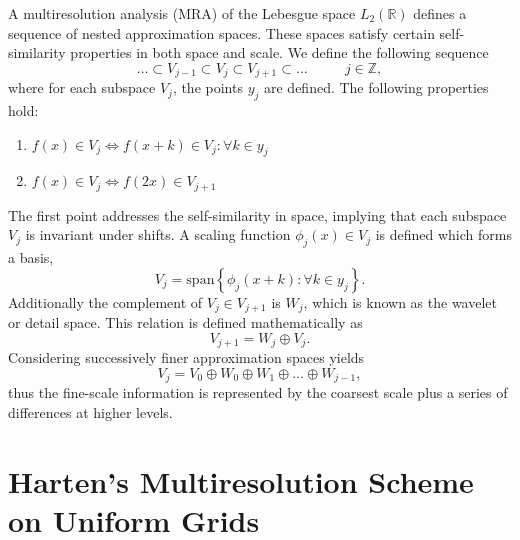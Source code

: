 \documentclass{article}
\begin{document}
    A multiresolution analysis (MRA) of the Lebesgue space
    $L_{2}(\mathbb{R})$ defines a sequence of nested approximation spaces.
    These spaces satisfy certain self-similarity properties in both space
    and scale. We define the following sequence
    \begin{equation*}
        \dots \subset V_{j-1} \subset V_{j} \subset V_{j+1} \subset \dots \text{ }
        \text{ } \text{ } \text{ } j\in \mathbb{Z},
    \end{equation*}
    where for each subspace $V_{j}$, the points $y_{j}$ are defined. The
    following properties hold:
    \begin{enumerate}
        \item $f(x) \in V_{j} \Leftrightarrow f(x+k) \in V_{j} : \forall k
            \in y_{j}$
        \item $f(x) \in V_{j} \Leftrightarrow f(2x) \in V_{j+1}$ 
    \end{enumerate}
    The first point addresses the self-similarity in space, implying that
    each subspace $V_{j}$ is invariant under shifts. A scaling function
    $\phi_{j}(x) \in V_{j}$ is defined which forms a basis,
    \begin{equation*}
        V_{j} = \text{span} \left\{ \phi_{j}(x+k) : \forall k \in y_{j}
        \right\}.
    \end{equation*}
    Additionally the complement of $V_{j} \in V_{j+1}$ is $W_{j}$, which is
    known as the wavelet or detail space. This relation is defined
    mathematically as
    \begin{equation*}
        V_{j+1} = W_{j} \oplus V_{j}.
    \end{equation*}
    Considering successively finer approximation spaces yields
    \begin{equation*}
        V_j = V_0 \oplus W_0 \oplus W_1 \oplus \dots \oplus W_{j-1},
    \end{equation*}
    thus the fine-scale information is represented by the coarsest scale
    plus a series of differences at higher levels.

\section{Harten's Multiresolution Scheme on Uniform Grids}
\end{document}
